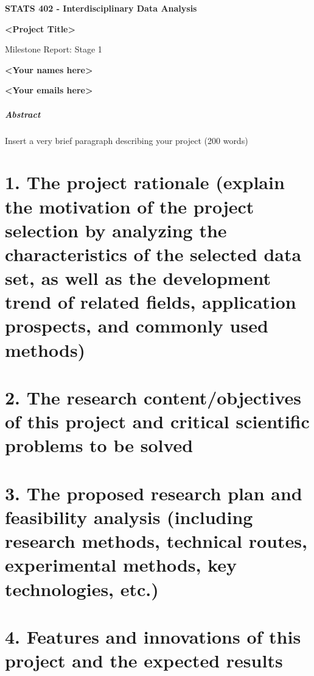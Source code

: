 \textbf{STATS 402 - Interdisciplinary Data Analysis}

\textbf{\textless Project Title\textgreater{}}

Milestone Report: Stage 1

\textbf{\textless Your names here\textgreater{}}

\textbf{\textless Your emails here\textgreater{}}

\subparagraph{Abstract}\label{abstract}

Insert a very brief paragraph describing your project (200 words)

\section{1. The project rationale (explain the motivation of the project
selection by analyzing the characteristics of the selected data set, as
well as the development trend of related fields, application prospects,
and commonly used
methods)}\label{the-project-rationale-explain-the-motivation-of-the-project-selection-by-analyzing-the-characteristics-of-the-selected-data-set-as-well-as-the-development-trend-of-related-fields-application-prospects-and-commonly-used-methods}

\section{\texorpdfstring{2. The research content/objectives of this
project and critical scientific problems to be solved
}{2. The research content/objectives of this project and critical scientific problems to be solved }}\label{the-research-contentobjectives-of-this-project-and-critical-scientific-problems-to-be-solved}

\section{\texorpdfstring{3. The proposed research plan and feasibility
analysis (including research methods, technical routes, experimental
methods, key technologies, etc.)
}{3. The proposed research plan and feasibility analysis (including research methods, technical routes, experimental methods, key technologies, etc.) }}\label{the-proposed-research-plan-and-feasibility-analysis-including-research-methods-technical-routes-experimental-methods-key-technologies-etc.}

\section{4. Features and innovations of this project and the expected
results}\label{features-and-innovations-of-this-project-and-the-expected-results}

